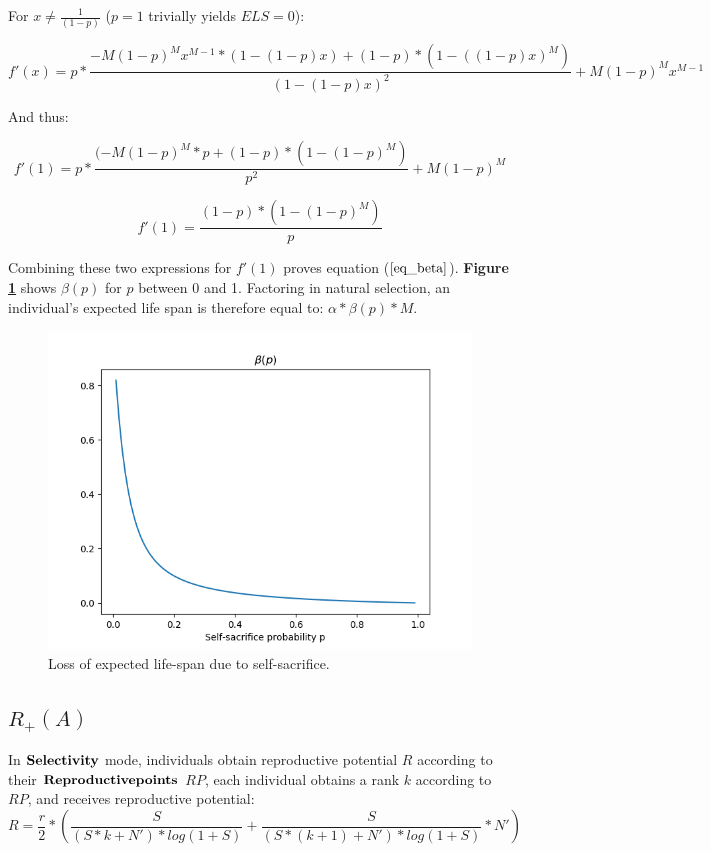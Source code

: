 \documentclass[a4paper,12pt]{report}
\begin{document}
For $x\neq\frac{1}{(1-p)}$ ($p=1$ trivially yields $ELS=0$):

\[ f'(x) = p * \frac{-M(1-p)^Mx^{M-1}*(1-(1-p)x) + (1-p)*(1-((1-p)x)^M)}{(1-(1-p)x)^2} + M(1-p)^Mx^{M-1} \]

And thus:

\[f'(1) = p * \frac{(-M(1-p)^M*p + (1-p)*(1-(1-p)^M)}{p^2} + M(1-p)^M \]

\begin{equation}
    f'(1) = \frac{(1-p)*(1-(1-p)^M)}{p}
\label{eq_f'}
\end{equation}

Combining these two expressions for $f'(1)$ proves equation ($\bf\ref{eq_beta}$). \textbf{Figure \ref{fig:beta}} shows
$\beta(p)$ for $p$ between 0 and 1. Factoring in natural selection, an individual's expected life span is therefore equal to: $\alpha*\beta(p)*M$.

\begin{figure}[h]
    \centering
    \includegraphics[width=1\textwidth]{Beta}
    \caption{Loss of expected life-span due to self-sacrifice.}
    \label{fig:beta}
    \end{figure}
    



\subsection{$R_{+}(A)$}
\label{ss:R+}
In $\bf{Selectivity}$ mode, individuals obtain reproductive potential $R$ according to their
$\bf{Reproductive points}$ $RP$, each individual obtains a rank $k$
according to $RP$, and receives reproductive potential:
\[ R = \frac{r}{2} * (\frac{S}
{(S*k + N')*log(1+S)} + \frac{S}{(S*(k+1) + N')*log(1+S)}*N') \]
\end{document}
